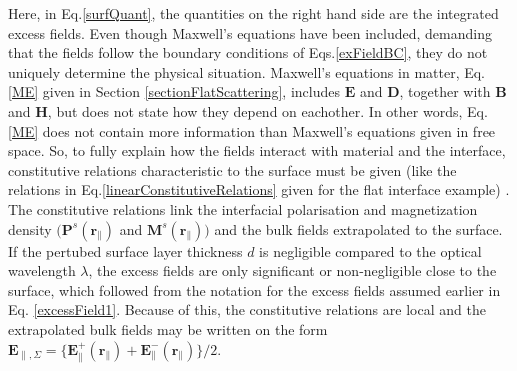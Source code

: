 Here, in Eq.\eqref{surfQuant}, the quantities on the right hand side
are the integrated excess fields.
%
%
Even though Maxwell's equations have been included, demanding that the fields follow the boundary 
conditions of Eqs.\eqref{exFieldBC}, they do not uniquely determine the physical situation. 
Maxwell's equations in matter, Eq.\eqref{ME} given in Section \ref{sectionFlatScattering}, includes
$\boldsymbol{E}$ and $\boldsymbol{D}$, together with $\boldsymbol{B}$ and $\boldsymbol{H}$, 
but does not state how they depend on eachother. In other words, Eq.\eqref{ME} does not contain
more information than Maxwell's equations given in free space. So, to fully explain how 
the fields interact with material and the interface, constitutive relations characteristic 
to the surface must be given (like the relations in Eq.\eqref{linearConstitutiveRelations} 
given for the flat interface example) \cite[p. 330]{Griffiths}.
The constitutive relations link the interfacial polarisation and 
magnetization density $\big(\boldsymbol{P}^s(\boldsymbol{r}_{\parallel})$ and 
$\boldsymbol{M}^s(\boldsymbol{r}_{\parallel}) \big)$ and the bulk fields extrapolated to the surface.
%
If the pertubed surface layer thickness $d$ is negligible compared to the optical wavelength $\lambda$,
the excess fields are only significant or non-negligible close to the surface, which followed
from the notation for the excess fields assumed earlier in Eq. \eqref{excessField1}.
Because of this, the constitutive relations are local and the extrapolated bulk fields may be written on the 
form 
$\boldsymbol{E}_{\parallel, \Sigma} = \big\{ \boldsymbol{E}^+_{\parallel} \!( \boldsymbol{r}\!_{\parallel} ) 
+  \boldsymbol{E}^-_{\parallel} \! (\boldsymbol{r}\!_{\parallel}) \big\} \big/2 $.
